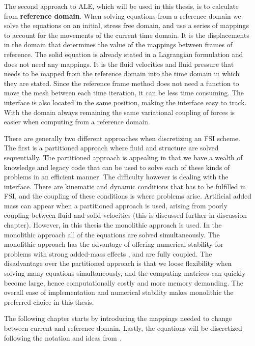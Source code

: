 The second approach to ALE, which will be used in this thesis, is to calculate from \textbf{reference domain}.
When solving equations from a reference domain we solve the equations on an initial, stress free domain, and use a series of mappings to account for the movements of the current time domain. It is the displacements in the domain that determines the value of the mappings between frames of reference. The solid equation is already stated in a Lagrangian formulation and does not need any mappings. It is the fluid velocities and fluid pressure that needs to be mapped from the reference domain into the time domain in which they are stated.
Since the reference frame method does not need a function to move the mesh between each time iteration, it can be less time consuming. The interface is also located in the same position, making the interface easy to track. With the domain always remaining the same variational coupling of forces is easier when computing from a reference domain.\newline

There are generally two different approaches when discretizing an FSI scheme. The first is a partitioned approach where fluid and structure are solved sequentially. The partitioned approach is appealing in that we have a wealth of knowledge and legacy code that can be used to solve each of these kinds of problems in an efficient manner. The difficulty however is dealing with the interface. There are kinematic and dynamic conditions that has to be fulfilled in FSI, and the coupling of these conditions is where problems arise. Artificial added mass can appear when a partitioned approach is used, arising from poorly coupling between fluid and solid velocities (this is discussed further in discussion chapter). However, in this thesis the monolithic approach is used. In the monolithic approach all of the equations are solved simultaneously. The monolithic approach has the advantage of offering numerical stability for problems with strong added-mass effects \cite{Liu2014}, and are fully coupled. The disadvantage over the partitioned approach is that we loose flexibility when solving many equations simultaneously, and the computing matrices can quickly become large, hence computationally costly and more memory demanding. The overall ease of implementation and numerical stability makes monolithic the preferred choice in this thesis. \newline

The following chapter starts by introducing the mappings needed to change between current and reference domain. Lastly, the equations will be discretized following the notation and ideas from \cite{Richter2010}.

